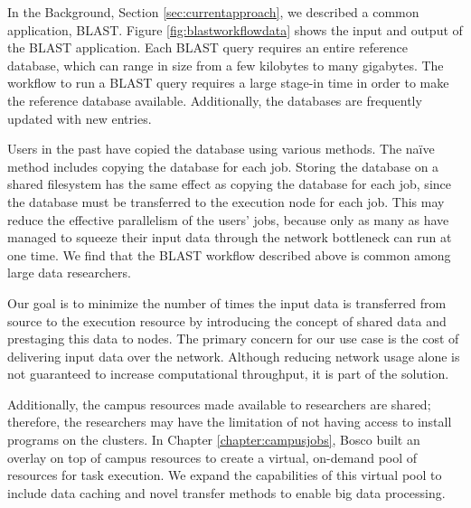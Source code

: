 In the Background, Section \ref{sec:currentapproach}, we described a common application, BLAST.  Figure \ref{fig:blastworkflowdata} shows the input and output of the BLAST application.  Each BLAST query requires an entire reference database, which can range in size from a few kilobytes to many gigabytes.  The workflow to run a BLAST query requires a large stage-in time in order to make the reference database available.  Additionally, the databases are frequently updated with new entries.

Users in the past have copied the database using various methods.  The na\"{i}ve method includes copying the database for each job.  Storing the database on a shared filesystem has the same effect as copying the database for each job, since the database must be transferred to the execution node for each job.  This may reduce the effective parallelism of the users' jobs, because only as many as have managed to squeeze their input data through the network bottleneck can run at one time.  We find that the BLAST workflow described above is common among large data researchers.

Our goal is to minimize the number of times the input data is transferred from source to the execution resource by introducing the concept of shared data and prestaging this data to nodes.  The primary concern for our use case is the cost of delivering input data over the network.  Although reducing network usage alone is not guaranteed to increase computational throughput, it is part of the solution.







Additionally, the campus resources made available to researchers are shared; therefore, the researchers may have the limitation of not having access to install programs on the clusters.  In Chapter \ref{chapter:campusjobs}, Bosco \cite{weitzel2014accessing} built an overlay on top of campus resources to create a virtual, on-demand pool of resources for task execution.  We expand the capabilities of this virtual pool to include data caching and novel transfer methods to enable big data processing.

